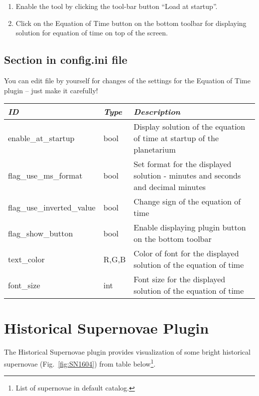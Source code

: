 \begin{enumerate}
\item Enable the tool by clicking the tool-bar button ``Load at startup''.
\item Click on the Equation of Time button on the bottom toolbar for displaying solution for equation of time on top of the screen.
\end{enumerate}

\subsection{Section  in config.ini file}
\label{sec:plugins:EquationOfTime:config}

You can edit  file by yourself for changes of the
settings for the Equation of Time plugin -- just make it carefully!

\begin{longtabu} to \textwidth {l|l|X}\toprule
\emph{ID}            & \emph{Type} & \emph{Description}\\\midrule
enable\_at\_startup  & bool & Display solution of the equation of time at startup of the planetarium\\\midrule
flag\_use\_ms\_format & bool & Set format for the displayed solution - minutes and seconds and decimal minutes\\\midrule
flag\_use\_inverted\_value & bool & Change sign of the equation of time \\\midrule
flag\_show\_button & bool & Enable displaying plugin button on the bottom toolbar\\\midrule
text\_color & R,G,B & Color of font for the displayed solution of the equation of time\\\midrule
font\_size & int & Font size for the displayed solution of the equation of time \\\bottomrule
\end{longtabu}

\newpage

\section{Historical Supernovae Plugin}
\label{sec:plugins:HistoricalSupernovae}
The Historical Supernovae plugin provides visualization of some bright historical supernovae (Fig.~\ref{fig:SN1604}) from table below\footnote{List of supernovae in default catalog.}.

